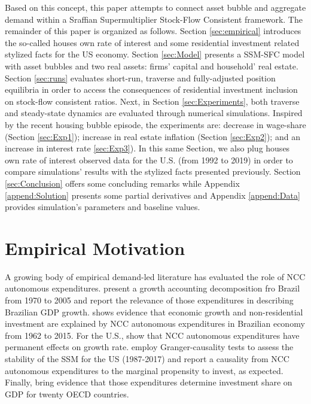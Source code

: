 \documentclass[11pt]{article}
\begin{document}
Based on this concept, this paper attempts to connect asset bubble and aggregate demand within a Sraffian Supermultiplier Stock-Flow Consistent framework. 
The remainder of this paper is organized as follows.
Section \ref{sec:empirical} introduces the so-called houses own rate of interest and some residential investment related stylized facts for the US economy.
Section \ref{sec:Model} presents a SSM-SFC model  with asset bubbles and two real assets: firms' capital and household' real estate. 
Section \ref{sec:runs} evaluates short-run, traverse and fully-adjusted position equilibria in order to access the consequences of residential investment inclusion on stock-flow consistent ratios.
Next, in Section \ref{sec:Experiments}, both traverse and steady-state dynamics are evaluated through numerical simulations.
Inspired by the recent housing bubble episode, the experiments are: decrease in wage-share (Section \ref{sec:Exp1}); increase in real estate inflation (Section \ref{sec:Exp2}); and an increase in interest rate \ref{sec:Exp3}).
In this same Section, we also plug houses own rate of interest observed data for the U.S. (from 1992 to 2019) in order to compare simulations' results with the stylized facts presented previously.
Section \ref{sec:Conclusion} offers some concluding remarks while Appendix \ref{append:Solution} presents some partial derivatives and Appendix \ref{append:Data} provides simulation's parameters and baseline values.



\section{Empirical Motivation}
\label{sec:org9d1257f}
\label{sec:empirical}
A growing body of empirical demand-led literature has evaluated the role of NCC autonomous expenditures.
\textcite{freitas_pattern_2013} present a growth accounting decomposition fro Brazil from 1970 to 2005 and report the relevance of those expenditures in describing Brazilian GDP growth. \textcite{braga_investment_2018} shows evidence that economic growth and non-residential investment are explained by NCC autonomous expenditures in Brazilian economy from 1962 to 2015. For the U.S., \textcite{girardi_long-run_2016} show that NCC autonomous expenditures have permanent effects on growth rate. 
\textcite{haluska_growth_2019} employ Granger-causality tests to assess the stability of the SSM for the US (1987-2017) and report a causality from NCC autonomous expenditures to the marginal propensity to invest, as expected.
Finally, \textcite{girardi_autonomous_2018} bring evidence that those expenditures determine investment share on GDP for twenty OECD countries.
\end{document}
